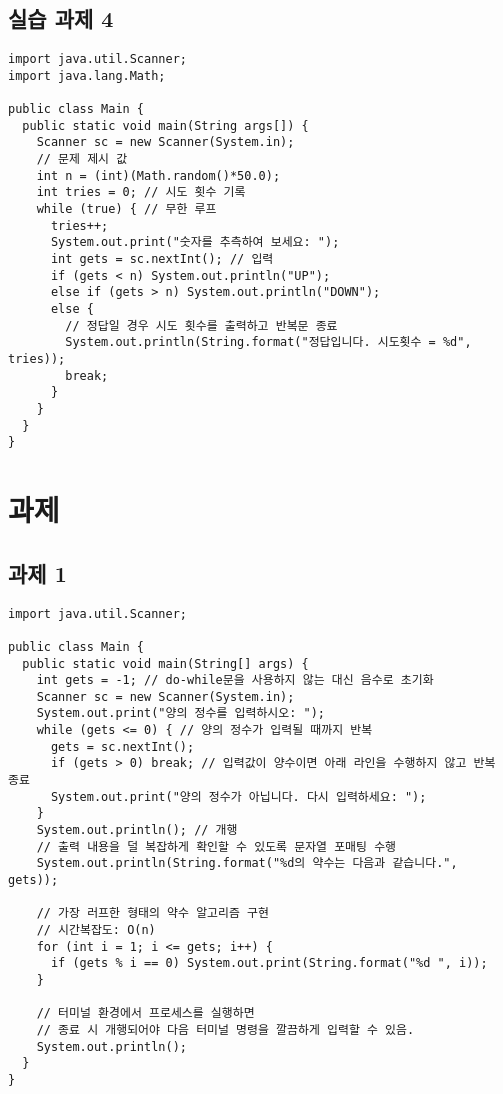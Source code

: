 \documentclass{article}
\begin{document}
\subsection{실습 과제 4}
\begin{lstlisting}
import java.util.Scanner;
import java.lang.Math;

public class Main {
  public static void main(String args[]) {
    Scanner sc = new Scanner(System.in);
    // 문제 제시 값
    int n = (int)(Math.random()*50.0);
    int tries = 0; // 시도 횟수 기록
    while (true) { // 무한 루프
      tries++;
      System.out.print("숫자를 추측하여 보세요: ");
      int gets = sc.nextInt(); // 입력
      if (gets < n) System.out.println("UP");
      else if (gets > n) System.out.println("DOWN");
      else {
        // 정답일 경우 시도 횟수를 출력하고 반복문 종료
        System.out.println(String.format("정답입니다. 시도횟수 = %d", tries));
        break;
      }
    }
  }
}
\end{lstlisting}
\section{과제}
\subsection{과제 1}
\begin{lstlisting}
import java.util.Scanner;

public class Main {
  public static void main(String[] args) {
    int gets = -1; // do-while문을 사용하지 않는 대신 음수로 초기화
    Scanner sc = new Scanner(System.in);
    System.out.print("양의 정수를 입력하시오: ");
    while (gets <= 0) { // 양의 정수가 입력될 때까지 반복
      gets = sc.nextInt();
      if (gets > 0) break; // 입력값이 양수이면 아래 라인을 수행하지 않고 반복 종료
      System.out.print("양의 정수가 아닙니다. 다시 입력하세요: ");
    }
    System.out.println(); // 개행
    // 출력 내용을 덜 복잡하게 확인할 수 있도록 문자열 포매팅 수행
    System.out.println(String.format("%d의 약수는 다음과 같습니다.", gets));

    // 가장 러프한 형태의 약수 알고리즘 구현
    // 시간복잡도: O(n)
    for (int i = 1; i <= gets; i++) {
      if (gets % i == 0) System.out.print(String.format("%d ", i));
    }

    // 터미널 환경에서 프로세스를 실행하면
    // 종료 시 개행되어야 다음 터미널 명령을 깔끔하게 입력할 수 있음.
    System.out.println();
  }
}
\end{lstlisting}
\end{document}
